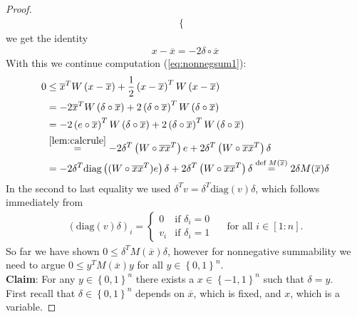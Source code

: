 \documentclass[12pt,a4paper]{article}
\theoremstyle{mythm}
\begin{document}
\begin{proof}
\begin{align*}
\begin{cases}
\end{cases}
\end{align*} 
we get the identity 
\begin{align*}
x - \overline{ x } = -2 \delta \circ \overline{ x } 
\end{align*} 
With this we continue computation (\ref{eq:nonnegsum1}):
\begin{align*}
0 
&\leq \overline{ x } ^T W \left( x- \overline{ x }  \right) + \frac{ 1 }{ 2 } \left( x - \overline{ x }  \right) ^T W \left( x - \overline{ x }  \right) \\
&= -2 \overline{ x } ^T W \left( \delta \circ \overline{ x }  \right) + 2 \left( \delta \circ \overline{ x }  \right) ^T W \left( \delta \circ \overline{ x }  \right) \\
&= -2 \left( e \circ \overline{ x } \right)  ^T W \left( \delta \circ \overline{ x }  \right) + 2 \left( \delta \circ \overline{ x }  \right) ^T W \left( \delta \circ \overline{ x }  \right) \\
&\overset{ \ref{lem:calcrule}  }{ =}  -2 \delta ^T \left( W \circ \overline{ x } \overline{ x } ^T \right)  e + 2 \delta ^T \left( W \circ \overline{ x } \overline{ x } ^T  \right) \delta \\
&= -2 \delta ^T \text{diag} \left( ( W \circ \overline{ x } \overline{ x } ^T ) e  \right) \delta + 2 \delta ^T \left( W \circ \overline{ x } \overline{ x } ^T  \right) \delta 
\overset{ \text{def } M ( \overline{ x }  )   }{=}  2 \delta M ( \overline{ x }  ) \delta
\end{align*} 
In the second to last equality we used $ \delta ^T v = \delta ^T \text{diag} \left( v \right) \delta $, which follows immediately from
\begin{align*}
\left(  \text{diag} (v) \delta \right) _{ i } = 
\begin{cases}
0 & \text{if } \delta _{ i } = 0 \\
v_i & \text{if } \delta _{ i } = 1
\end{cases}
\quad \text{ for all } i \in \left[ 1:n \right].
\end{align*} 
So far we have shown $ 0 \leq \delta ^T M ( \overline{ x }  ) \delta  $, however for nonnegative summability we need to argue $ 0 \leq y ^T M ( \overline{ x }
) y  $ for all $ y \in \left\{ 0,1 \right\} ^{ n }  $.\\
\textbf{Claim}: For any $ y \in \left\{ 0,1 \right\} ^{ n } $ there exists a $ x \in \left\{ -1,1 \right\} ^{ n }  $ such that $ \delta = y $. \\
First recall that $ \delta \in \left\{ 0,1 \right\} ^{ n } $ depends on $ \overline{ x }  $, which is fixed, and $ x $, which is a variable. 

\end{proof}
\end{document}
